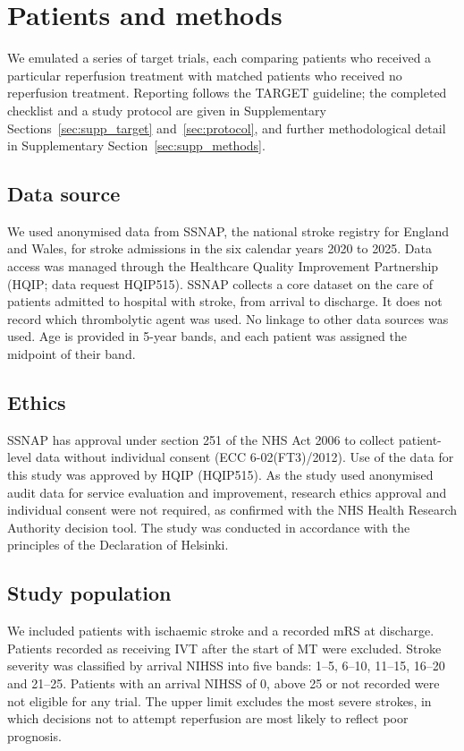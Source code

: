 \section{Patients and methods}

We emulated a series of target trials, each comparing patients who received a particular reperfusion treatment with matched patients who received no reperfusion treatment. Reporting follows the TARGET guideline\cite{cashin_target_2025}; the completed checklist and a study protocol are given in Supplementary Sections~\ref{sec:supp_target} and~\ref{sec:protocol}, and further methodological detail in Supplementary Section~\ref{sec:supp_methods}.

\subsection{Data source}

We used anonymised data from SSNAP, the national stroke registry for England and Wales, for stroke admissions in the six calendar years 2020 to 2025\cite{ssnap_website}. Data access was managed through the Healthcare Quality Improvement Partnership (HQIP; data request HQIP515). SSNAP collects a core dataset on the care of patients admitted to hospital with stroke, from arrival to discharge. It does not record which thrombolytic agent was used. No linkage to other data sources was used. Age is provided in 5-year bands, and each patient was assigned the midpoint of their band.

\subsection{Ethics}

SSNAP has approval under section 251 of the NHS Act 2006 to collect patient-level data without individual consent (ECC 6-02(FT3)/2012). Use of the data for this study was approved by HQIP (HQIP515). As the study used anonymised audit data for service evaluation and improvement, research ethics approval and individual consent were not required, as confirmed with the NHS Health Research Authority decision tool. The study was conducted in accordance with the principles of the Declaration of Helsinki.

\subsection{Study population}

We included patients with ischaemic stroke and a recorded mRS at discharge\cite{van_swieten_interobserver_1988}. Patients recorded as receiving IVT after the start of MT were excluded. Stroke severity was classified by arrival NIHSS\cite{brott_measurements_1989} into five bands: 1--5, 6--10, 11--15, 16--20 and 21--25. Patients with an arrival NIHSS of 0, above 25 or not recorded were not eligible for any trial. The upper limit excludes the most severe strokes, in which decisions not to attempt reperfusion are most likely to reflect poor prognosis.

